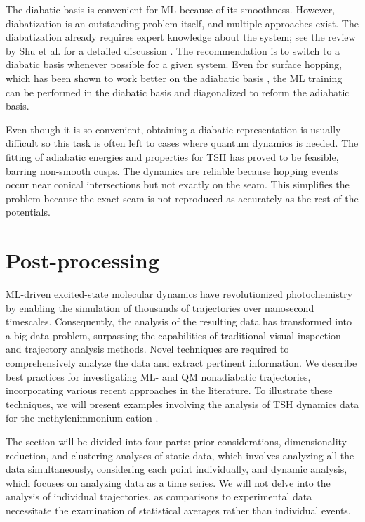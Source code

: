 \documentclass[9pt,bestpractices]{livecoms}
\begin{document}
The diabatic basis is convenient for ML because of its smoothness. However, diabatization is an outstanding problem itself, and multiple approaches exist. The diabatization already requires expert knowledge about the system; see the review by Shu et al. for a detailed discussion \cite{RN26}. The recommendation is to switch to a diabatic basis whenever possible for a given system. Even for surface hopping, which has been shown to work better on the adiabatic basis \cite{RN154, RN139}, the ML training can be performed in the diabatic basis and diagonalized to reform the adiabatic basis.

Even though it is so convenient, obtaining a diabatic representation is usually difficult so this task is often left to cases where quantum dynamics is needed. The fitting of adiabatic energies and properties for TSH has proved to be feasible, barring non-smooth cusps. The dynamics are reliable because hopping events occur near conical intersections but not exactly on the seam. This simplifies the problem because the exact seam is not reproduced as accurately as the rest of the potentials. 

\section{Post-processing}
\label{sec:postprocessing}

ML-driven excited-state molecular dynamics have revolutionized photochemistry by enabling the simulation of thousands of trajectories over nanosecond timescales. Consequently, the analysis of the resulting data has transformed into a big data problem, surpassing the capabilities of traditional visual inspection and trajectory analysis methods. Novel techniques are required to comprehensively analyze the data and extract pertinent information. We describe best practices for investigating ML- and QM nonadiabatic trajectories, incorporating various recent approaches in the literature. To illustrate these techniques, we will present examples involving the analysis of TSH dynamics data for the methylenimmonium cation \cite{RN132}.

The section will be divided into four parts: prior considerations, dimensionality reduction, and clustering analyses of static data, which involves analyzing all the data simultaneously, considering each point individually, and dynamic analysis, which focuses on analyzing data as a time series. We will not delve into the analysis of individual trajectories, as comparisons to experimental data necessitate the examination of statistical averages rather than individual events. 
\end{document}
